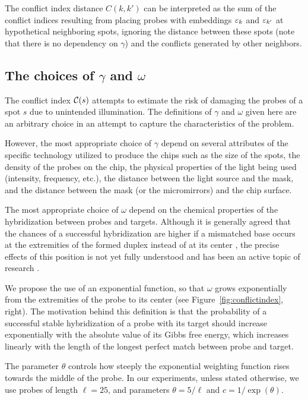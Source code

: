 The conflict index distance $C(k,k')$ can be interpreted as the sum of the
conflict indices resulting from placing probes with embeddings $\varepsilon_k$ and
$\varepsilon_{k'}$ at hypothetical neighboring spots, ignoring the distance between
these spots (note that there is no dependency on $\gamma$) and the conflicts
generated by other neighbors.

\subsection{The choices of $\gamma$ and $\omega$}

The conflict index ${\mathcal{C}}(s)$ attempts to estimate the risk of damaging the
probes of a spot $s$ due to unintended illumination. The definitions of $\gamma$
and $\omega$ given here are an arbitrary choice in an attempt to capture the
characteristics of the problem.

However, the most appropriate choice of $\gamma$ depend on several attributes of
the specific technology utilized to produce the chips such as the size of the
spots, the density of the probes on the chip, the physical properties of the
light being used (intensity, frequency, etc.), the distance between the light
source and the mask, and the distance between the mask (or the micromirrors) and
the chip surface.

The most appropriate choice of $\omega$ depend on the chemical properties of the
hybridization between probes and targets. Although it is generally agreed that
the chances of a successful hybridization are higher if a mismatched base occurs
at the extremities of the formed duplex instead of at its center
\citep{Hubbell1999}, the precise effects of this position is not yet fully
understood and has been an active topic of research \citep{Binder2005}.

We propose the use of an exponential function, so that $\omega$ grows
exponentially from the extremities of the probe to its center (see
Figure~\ref{fig:conflictindex}, right). The motivation behind this definition is
that the probability of a successful stable hybridization of a probe with its
target should increase exponentially with the absolute value of its Gibbs free
energy, which increases linearly with the length of the longest perfect match
between probe and target.

The parameter $\theta$ controls how steeply the exponential weighting function
rises towards the middle of the probe. In our experiments, unless stated
otherwise, we use probes of length $\ell=25$, and parameters $\theta = 5/\ell$
and $c = 1/\exp{(\theta)}$.

